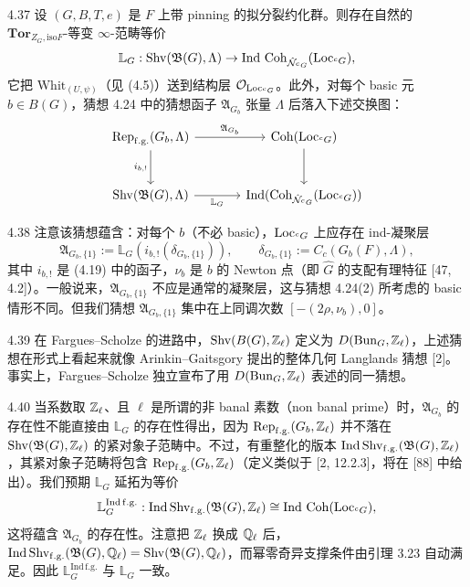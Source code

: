 \begin{conj}{4.37}\label{thm:a2-4-37}
设 $(G,B,T,e)$ 是 $F$ 上带 pinning 的拟分裂约化群。则存在自然的 $\mathbf{Tor}_{Z_G,\mathrm{iso}F}$-等变 $\infty$-范畴等价
\[
\mathbb L_G:\mathrm{Shv}(\mathfrak B(G),\Lambda)\to\mathrm{Ind}\,\operatorname{Coh}_{\hat{\mathcal N}_{{}^{c}G}}(\operatorname{Loc}_{{}^{c}G}),
\]
它把 $\mathrm{Whit}_{(U,\psi)}$（见 (4.5)）送到结构层 $\mathcal O_{\operatorname{Loc}_{{}^{c}G}}$。此外，对每个 basic 元 $b\in B(G)$，猜想 4.24 中的猜想函子 $\mathfrak A_{G_b}$ 张量 $\Lambda$ 后落入下述交换图：
\[
\begin{tikzcd}[column sep=large,row sep=large]
\Rep_{\mathrm{f.g.}}(G_b,\Lambda) \arrow[r, "\mathfrak A_{G_b}"] \arrow[d, "i_{b,!}"'] & \Coh(\Loc_{{}^{c}G}) \arrow[d] \\
\mathrm{Shv}(\mathfrak B(G),\Lambda) \arrow[r, "\mathbb L_G"'] & \mathrm{Ind}(\Coh_{\hat{\mathcal N}_{{}^{c}G}}(\Loc_{{}^{c}G}))
\end{tikzcd}
\]
\end{conj}

\begin{rem}{4.38}\label{thm:a2-4-38}
注意该猜想蕴含：对每个 $b$（不必 basic），$\operatorname{Loc}_{{}^{c}G}$ 上应存在 ind-凝聚层
\[
\mathfrak A_{G_b,\{1\}}:=\mathbb L_G(i_{b,!}(\delta_{G_b,\{1\}})),\qquad \delta_{G_b,\{1\}}:=C_c(G_b(F),\Lambda),
\]
其中 $i_{b,!}$ 是 (4.19) 中的函子，$\nu_b$ 是 $b$ 的 Newton 点（即 $\hat G$ 的支配有理特征 [47, 4.2]）。一般说来，$\mathfrak A_{G_b,\{1\}}$ 不应是通常的凝聚层，这与猜想 4.24(2) 所考虑的 basic 情形不同。但我们猜想 $\mathfrak A_{G_b,\{1\}}$ 集中在上同调次数 $[-(2\rho,\nu_b),0]$。
\end{rem}

\begin{rem}{4.39}\label{thm:a2-4-39}
在 Fargues–Scholze 的进路中，$\mathrm{Shv}(B(G),\mathbb{Z}_\ell)$ 定义为 $D(\operatorname{Bun}_G,\mathbb{Z}_\ell)$，上述猜想在形式上看起来就像 Arinkin–Gaitsgory 提出的整体几何 Langlands 猜想 [2]。事实上，Fargues–Scholze 独立宣布了用 $D(\operatorname{Bun}_G,\mathbb{Z}_\ell)$ 表述的同一猜想。
\end{rem}

\begin{rem}{4.40}\label{thm:a2-4-40}
当系数取 $\mathbb{Z}_\ell$、且 $\ell$ 是所谓的非 banal 素数（non banal prime）时，$\mathfrak A_{G_b}$ 的存在性不能直接由 $\mathbb L_G$ 的存在性得出，因为 $\operatorname{Rep}_{\mathrm{f.g.}}(G_b,\mathbb{Z}_\ell)$ 并不落在 $\mathrm{Shv}(\mathfrak B(G),\mathbb{Z}_\ell)$ 的紧对象子范畴中。不过，有重整化的版本 $\mathrm{Ind}\,\mathrm{Shv}_{\mathrm{f.g.}}(\mathfrak B(G),\mathbb{Z}_\ell)$，其紧对象子范畴将包含 $\operatorname{Rep}_{\mathrm{f.g.}}(G_b,\mathbb{Z}_\ell)$（定义类似于 [2, 12.2.3]，将在 [88] 中给出）。我们预期 $\mathbb L_G$ 延拓为等价
\[
\mathbb L_G^{\mathrm{Ind\,f.g.}}:\mathrm{Ind}\,\mathrm{Shv}_{\mathrm{f.g.}}(\mathfrak B(G),\mathbb{Z}_\ell)\cong\mathrm{Ind}\,\operatorname{Coh}(\operatorname{Loc}_{{}^{c}G}),
\]
这将蕴含 $\mathfrak A_{G_b}$ 的存在性。注意把 $\mathbb{Z}_\ell$ 换成 $\mathbb{Q}_\ell$ 后，$\mathrm{Ind}\,\mathrm{Shv}_{\mathrm{f.g.}}(\mathfrak B(G),\mathbb{Q}_\ell)=\mathrm{Shv}(\mathfrak B(G),\mathbb{Q}_\ell)$，而幂零奇异支撑条件由引理 3.23 自动满足。因此 $\mathbb L_G^{\mathrm{Ind\,f.g.}}$ 与 $\mathbb L_G$ 一致。
\end{rem}

